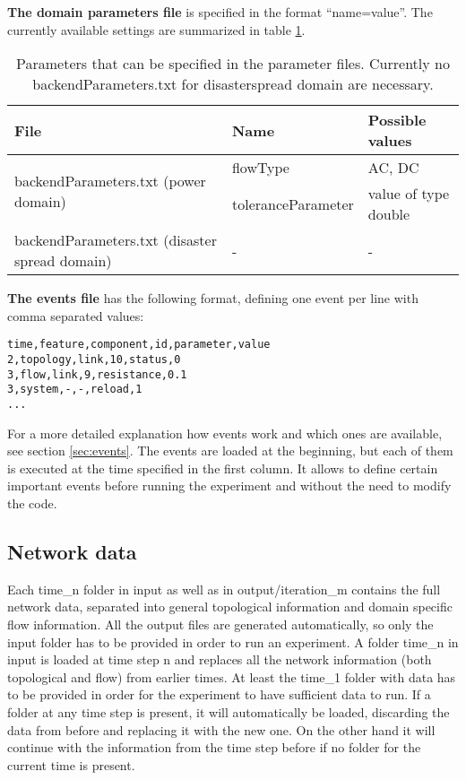 \documentclass[11pt,fleqn]{book} %
\newcommand{\domain}[1][]{domain#1}
\newcommand{\backendparameters}{domain parameters}
\newcommand{\backendParametersFile}{backendParameters.txt}
\begin{document}
\textbf{The \backendparameters{} file} is specified in the format “name=value”. The currently available settings are summarized in table \ref{table:params}.

\begin{table}[h]
\centering
\begin{tabular}{|l| l| l|}
\hline
\rowcolor{Gray}
File & Name & Possible values\\
\hline
\multirow{2}{*}{\parbox{4cm}{\backendParametersFile{} (power \domain{})} } & flowType & AC, DC \\ 
\cline{2-3} & toleranceParameter & value of type double \\ \hline
\backendParametersFile{} (disaster spread \domain{}) & - & - \\ \hline
\end{tabular}
\label{table:params}
\caption{Parameters that can be specified in the parameter files. Currently no \backendParametersFile{} for disaster\textunderscore spread \domain{} are necessary.}
\end{table}

\textbf{The events file} has the following format, defining one event per line with comma separated values:

\begin{lstlisting}[frame=single] 
time,feature,component,id,parameter,value
2,topology,link,10,status,0
3,flow,link,9,resistance,0.1
3,system,-,-,reload,1
...
\end{lstlisting}

For a more detailed explanation how events work and which ones are available, see  section \ref{sec:events}. The events are loaded at the beginning, but each of them is executed at the time specified in the first column. It allows to define certain important events before running the experiment and without the need to modify the code. 

\subsection{Network data}
Each time\_n folder in input as well as in output/iteration\_m contains the full network data, separated into general topological information and \domain{} specific flow information. All the output files are generated automatically, so only the input folder has to be provided in order to run an experiment. A folder time\_n in input is loaded at time step n and replaces all the network information (both topological and flow) from earlier times. At least the time\_1 folder with data has to be provided in order for the experiment to have sufficient data to run. If a folder at any time step is present, it will automatically be loaded, discarding the data from before and replacing it with the new one. On the other hand it will continue with the information from the time step before if no folder for the current time is present.
\end{document}
